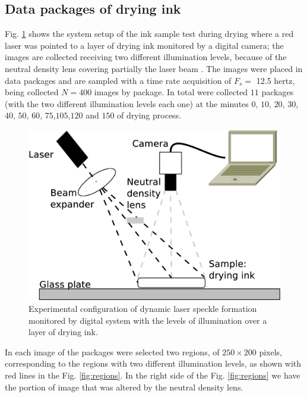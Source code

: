 \documentclass[review]{elsarticle}
\begin{document}
\subsection{Data packages of drying ink}
\label{sec:descriptionink}
Fig. \ref{fig:system} shows the system setup of the ink sample test during drying where
a red laser was pointed to a layer of drying ink monitored by a digital camera;
the images are collected receiving two different illumination levels, because of the neutral 
density lens covering partially the laser beam \cite{REIS2016}.
The images were placed in data packages and
are sampled with a time rate acquisition of $F_s=$ 12.5 hertz, being 
collected $N=400$ images by package. In total were collected $11$ packages 
(with the two different illumination levels each one) at the minutes 
$0$, $10$, $20$, $30$, $40$, $50$, $60$, $75$,$105$,$120$ and $150$ of drying process. 
\begin{figure}[ht!]
\centering
\includegraphics[width=0.65\columnwidth]{system.eps}
\caption{Experimental configuration of dynamic laser speckle formation monitored by digital system with the levels of illumination over a layer of drying ink.}
\label{fig:system}
\end{figure}
In each image of the packages were selected two regions, of $250\times200$ pixels, 
corresponding to the regions with two different illumination levels, 
as shown with red lines in the Fig. \ref{fig:regions}. In the right side of the Fig. \ref{fig:regions}  we have the
portion of image that was altered by the neutral density lens. 
\end{document}
